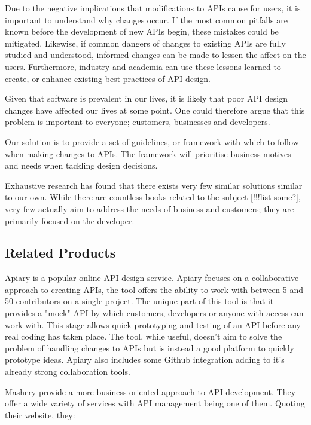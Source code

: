 \documentclass{article}
\begin{document}
Due to the negative implications that modifications to APIs cause for users, it is important to understand why changes occur. If the most common pitfalls are known before the development of new APIs begin, these mistakes could be mitigated. Likewise, if common dangers of changes to existing APIs are fully studied and understood, informed changes can be made to lessen the affect on the users. Furthermore, industry and academia can use these lessons learned to create, or enhance existing best practices of API design.

Given that software is prevalent in our lives, it is likely that poor API design changes have affected our lives at some point. One could therefore argue that this problem is important to everyone; customers, businesses and developers.

Our solution is to provide a set of guidelines, or framework with which to follow when making changes to APIs. The framework will prioritise business motives and needs when tackling design decisions.

Exhaustive research has found that there exists very few similar solutions similar to our own. While there are countless books related to the subject [!!!list some?], very few actually aim to address the needs of business and customers; they are primarily focused on the developer.

\subsection{Related Products}
Apiary is a popular online API design service. Apiary focuses on a collaborative approach to creating APIs, the tool offers the ability to work with between 5 and 50 contributors on a single project. The unique part of this tool is that it provides a "mock" API by which customers, developers or anyone with access can work with. This stage allows quick prototyping and testing of an API before any real coding has taken place. The tool, while useful, doesn't aim to solve the problem of handling changes to APIs but is instead a good platform to quickly prototype ideas. Apiary also includes some Github integration adding to it's already strong collaboration tools.

Mashery provide a more business oriented approach to API development. They offer a wide variety of services with API management being one of them. Quoting their website, they:
\end{document}
